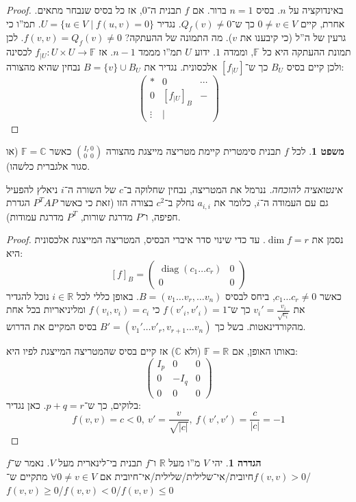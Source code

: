 \documentclass[a4paper]{article}
\newcommand\R     {\mathbb{R}}
\newcommand\C     {\mathbb{C}}
\DeclareMathOperator{\diag}    {diag}
\newcommand\F         {\mathbb{F}}
\newcommand\co        {\colon}
\newcommand\pms[1]    {\begin{pmatrix}
		#1
\end{pmatrix}}
\theoremstyle{definition}
\newtheorem{Theorem}{\color{myblue}משפט}
\newtheorem{Definition}{\color{mygreen}הגדרה}
\newcommand\theo  [1] {\begin{Theorem}#1\end{Theorem}}
\newcommand\defi  [1] {\begin{Definition}#1\end{Definition}}
\begin{document}
	\begin{proof}
		באינדוקציה על $n$. בסיס $n = 1$ ברור. אם $f$ תבנית ה־$0$, אז כל בסיס שנבחר מתאים. אחרת, קיים $0 \neq v \in V$ כך ש־$Q_f(v) \neq 0$. נגדיר $U = \{u \in V \mid f(u, v) = 0\}$. תמ''ו כי גרעין של ה''ל (כי קיבענו את $v$). מה התמונה של ההעתקה? $f(v, v) = Q_f(v) \neq 0$. לכן תמונת ההעתקה היא כל $\F$, וממדה $1$. ידוע $U$ תמ''ו מממד $n - 1$. אז $f_{|U} \co U\times U \to \F$ לכסינה ולכן קיים בסיס $B_U$ כך ש־$[f_{|U}]$ אלכסונית. נגדיר את $B = \{v\} \cup B_U$ נבחין שהיא מהצורה: 
		\[ \pms{* & 0& \cdots \\ 0 & [f_{|U}]_B& - \\ \vdots & \vert} \]
	\end{proof}
	
	\theo{לכל $f$ תבנית סימטרית קיימת מטריצה מייצגת מהצורה $\binom{I_r \, 0}{0 \,\,\, 0}$ כאשר $\F = \C$ (או סגור אלגברית כלשהו). }
	\textit{אינטואציה להוכחה. }ננרמל את המטריצה, נבחין שחלוקה ב־$c$ של השורה ה־$i$ ניאלץ להפעיל גם עם העמודה ה־$i$, כלומר את $a_{i, i}$ נחלק ב־$c^{2}$ בצורה הזו (זאת כי כאשר $P^TAP$ הגדרת חפיפה, ו־$P$ מדרגת שורות, $P^{T}$ מדרגת עמודות). 
	\begin{proof}		
		נסמן את $\dim f = r$. עד כדי שינוי סדר איברי הבסיס, המטריצה המייצגת אלכסונית היא:
		\[ [f]_B = \pms{\diag(c_1 \dots c_r) & 0 \\ 0 & 0} \]
		כאשר $c_1 \dots c_r \neq 0$, ביחס לבסיס $B = (v_1 \dots v_r, \dots v_n)$. באופן כללי לכל $i \in \R$ נוכל להגדיר את $v_i' = \frac{v_i}{\sqrt{c_i}}$ כך ש־$f(v'_i, v'_i) = 1$ כי $f(v_i, v_i) = c_i$ ומליניאריות בכל אחת מהקורדינאטות. בשל כך $B' = (v_1' \dots v'_r, v_{r + 1} \dots v_n)$ בסיס המקיים את הדרוש. 
		
		באותו האופן, אם $\F = \R$ (ולא $\C$) אז קיים בסיס שהמטריצה המייצגת לפיו היא: 
		\[ \pms{I_p & 0 & 0 \\ 0& -I_q & 0 \\0 & 0 & 0} \]
		בלוקים, כך ש־$p + q = r$. כאן נגדיר: 
		\[ f(v, v) = c < 0, \ v' = \frac{v}{\sqrt{|c|}}, \ f(v', v') = \frac{c}{|c|} = -1 \]
	\end{proof}
	
	\defi{יהי $V$ מ''ו מעל $\R$ ו־$f$ תבנית בי־לינארית מעל $V$. נאמר ש־$f$ חיובית/אי־שלילית/שלילית/אי־חיובית אם $\forall 0 \neq v \in V $ מתקיים ש־$f(v, v) > 0$/$f(v, v) \ge 0$/$f(v, v) < 0$/$f(v, v)\le 0$}
	
\end{document}
